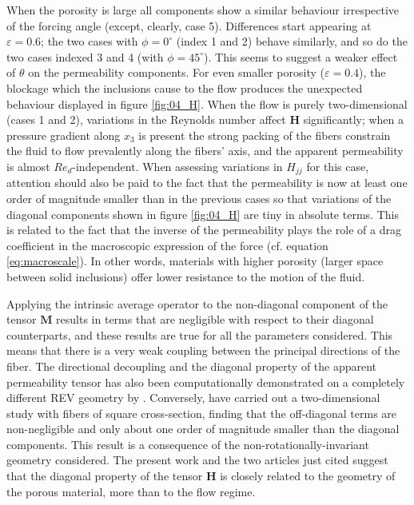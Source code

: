 When the porosity is large all components show a similar behaviour irrespective of the forcing angle (except, clearly, case 5). Differences 
start appearing at $\varepsilon=0.6$; the two cases with $\phi=0^{\circ}$ (index 1 and 2) behave similarly, and so do the two cases indexed 3 
and 4 (with $\phi=45^{\circ}$). This seems to suggest a weaker effect of $\theta$ on the permeability components.  For even smaller porosity ($
\varepsilon=0.4$), the blockage which the inclusions cause to the flow produces the unexpected behaviour displayed in figure \ref{fig:04_H}. 
When the flow is purely two-dimensional (cases 1 and 2), variations in the Reynolds number affect $\mathbf{H}$ significantly; when a pressure 
gradient along $x_3$ is present the strong packing of the fibers constrain the fluid to flow prevalently along the fibers' axis, and the 
apparent permeability is almost $Re_d$-independent. When assessing variations in $H_{jj}$ for this case, attention should also be paid to the 
fact that the permeability is now at least one order of magnitude smaller than in the previous cases so that variations of the diagonal 
components shown in figure \ref{fig:04_H} are tiny in absolute terms.  This is related to the fact that  the  inverse of the permeability  
plays the role of a drag coefficient in the macroscopic expression of the force  (cf. equation \eqref{eq:macroscale}).  In other words, 
materials with higher porosity (larger space between solid inclusions) offer lower resistance to the motion of the fluid.


Applying the intrinsic average operator to the non-diagonal component of the tensor $\mathbf{M}$ results in terms that are negligible with respect to their diagonal counterparts, and these results are true for all the parameters considered. This means that there is a very weak coupling between the principal directions of the fiber.
The directional decoupling and the diagonal property of the apparent permeability tensor has also been computationally demonstrated
on a completely different REV geometry by \citet{soulaine2014}. Conversely,
\citet{lasseux} have carried out a two-dimensional study with fibers of square cross-section, finding that the off-diagonal terms are 
non-negligible and only about
one order of magnitude smaller than the diagonal components. This result is a consequence of the non-rotationally-invariant  geometry  
considered.  The present work and the two articles just cited suggest that the  diagonal property of the tensor $\mathbf{H}$   is closely
related to the geometry of the porous material, more  than to the flow regime.  



